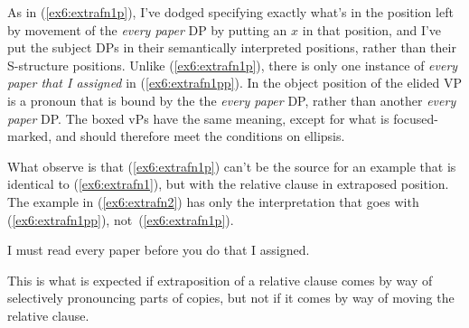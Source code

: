 As in (\ref{ex6:extrafn1p}), I've dodged specifying exactly what's in the position left by movement of the \emph{every paper} DP by putting an $x$ in that position, and I've put the subject DPs in their semantically interpreted positions, rather than their S-structure positions. Unlike (\ref{ex6:extrafn1p}), there is only one instance of \emph{every paper that I assigned} in (\ref{ex6:extrafn1pp}). In the object position of the elided VP is a pronoun that is bound by the the \emph{every paper} DP, rather than another \emph{every paper} DP. The boxed vPs have the same meaning, except for what is focused-marked, and should therefore meet the conditions on ellipsis.

What \citet{Fox:1999a} observe is that (\ref{ex6:extrafn1p}) can't be the source for an example that is identical to (\ref{ex6:extrafn1}), but with the relative clause in extraposed position. The example in (\ref{ex6:extrafn2}) has only the interpretation that goes with (\ref{ex6:extrafn1pp}), not~(\ref{ex6:extrafn1p}).
\begin{exe}
\raggedright
	\ex \label{ex6:extrafn2}
	I must read every paper before you do that I assigned.
\end{exe}
This is what is expected if extraposition of a relative clause comes by way of selectively pronouncing parts of copies, but not if it comes by way of moving the relative clause. 


